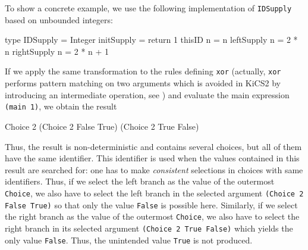 \documentclass{llncs}
\newcommand{\code}[1]{\mbox{\small\texttt{#1}}}
\begin{document}
To show a concrete example, we use the following implementation
of \code{IDSupply} based on unbounded integers:
%
\begin{haskell}
  type IDSupply = Integer
  initSupply    = return 1
  thisID      n = n
  leftSupply  n = 2 * n
  rightSupply n = 2 * n + 1
\end{haskell}
%
If we apply the same transformation to the rules defining \code{xor}
(actually, \code{xor} performs pattern matching on two arguments
which is avoided in KiCS2 by introducing an intermediate operation,
see \cite{BrasselFischerHanusReck11}) and evaluate the main expression
\code{(main 1)},
we obtain the result
\begin{haskell}
  Choice 2 (Choice 2 False True) (Choice 2 True False)
\end{haskell}
Thus, the result is non-deterministic and contains several choices,
but all of them have the same identifier.
This identifier is used when the values contained in this result
are searched for: one has to make \emph{consistent} selections in choices with
same identifiers. Thus, if we select the left branch as the value
of the outermost \code{Choice}, we also have to select the left branch
in the selected argument \code{(Choice 2 False True)} so that only
the value \code{False} is possible here.
Similarly, if we select the right branch as the value of the outermost
\code{Choice}, we also have to select the right branch in
its selected argument \code{(Choice 2 True False)} which yields the only
value \code{False}.
Thus, the unintended value \code{True} is not produced.
\end{document}
